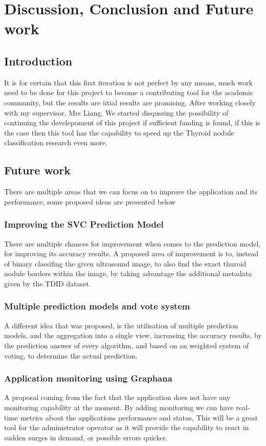 \chapter{Discussion, Conclusion and Future work}
\label{ch:lit_rev}
	\section{Introduction}
		It is for certain that this first iteration is not perfect by any means, much work need to be done for this project to become 
		a contributing tool for the academic community, but the results are iitial results are promising. After working closely with
		my supervisor, Mrs Liang, We started disqussing the possibility of continuing the develepoment of this project if sufficient
		funding is found, if this is the case then this tool has the capability to speed up the Thyroid nodule classification research even
		more.
	\section{Future work}
		There are multiple areas that we can focus on to improve the application and its performance, some proposed ideas are presented below
		\subsection{Improving the SVC Prediction Model}
			There are multiple chances for improvement when comes to the prediction model, for improving its accuracy results. A proposed
			area of improvement is to, instead of binary classifing the given ultrasound image, to also find the exact thuroid nodule borders
			within the image, by taking advantage the additional metadata given by the TDID dataset.
		\subsection{Multiple prediction models and vote system}
			A different idea that was proposed, is the utilisation of multiple prediction models, and the aggregation into a single view, increasing
			the accuracy results, by the prediction answer of every algorithm, and based on an weighted system of voting, to determine the actual
			prediction.
		\subsection{Application monitoring using Graphana}
			A proposal coming from the fact that the application does not have any monitoring capability at the moment. By adding monitoring
			we can have real-time metrics about the applications performance and status, This will be a great tool for the administrator operator as it
			will provide the capability to react in sudden surges in demand, or possible errors quicker.
